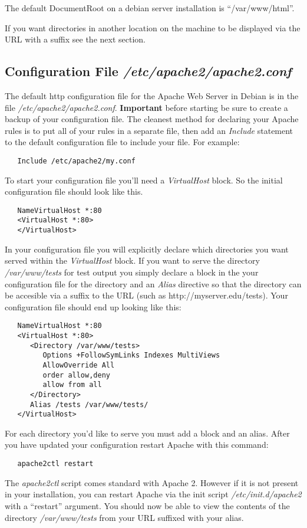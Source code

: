 \documentclass[12pt]{article}
\begin{document}
The default DocumentRoot on a debian server installation is ``/var/www/html''. 

If you want directories in another location on the machine to be displayed via the URL with a suffix see the next section.

\subsection*{Configuration File {\it /etc/apache2/apache2.conf}}

The default http configuration file for the Apache Web Server in Debian is in the file {\it /etc/apache2/apache2.conf}.  \textbf{Important} before starting be sure to create a backup of your configuration file. The cleanest method for declaring your Apache rules is to put all of your rules in a separate file, then add an {\it Include} statement to the default configuration file to include your file. For example:
\begin{verbatim}
   Include /etc/apache2/my.conf
\end{verbatim}
To start your configuration file you'll need a {\it VirtualHost} block. So the initial configuration file should look like this.
\begin{verbatim}
   NameVirtualHost *:80
   <VirtualHost *:80>
   </VirtualHost>
\end{verbatim}
In your configuration file you will explicitly declare which directories you want served within the {\it VirtualHost} block. If you want to serve the directory {\it /var/www/tests} for test output you simply declare a block in the your configuration file for the directory and an {\it Alias} directive so that the directory can be accesible via a suffix to the URL (such as http://myserver.edu/tests). Your configuration file should end up looking like this:
\begin{verbatim}
   NameVirtualHost *:80
   <VirtualHost *:80>   
      <Directory /var/www/tests>
         Options +FollowSymLinks Indexes MultiViews
         AllowOverride All
         order allow,deny
         allow from all
      </Directory>
      Alias /tests /var/www/tests/
   </VirtualHost>
\end{verbatim}
For each directory you'd like to serve you must add a block and an alias. After you have updated your configuration restart Apache with this command:
\begin{verbatim}
   apache2ctl restart
\end{verbatim}
The \textit{apache2ctl} script comes standard with Apache 2. However if it is not present in your installation, you can restart Apache via the init script \textit{/etc/init.d/apache2} with a ``restart'' argument. You should now be able to view the contents of the directory {\it /var/www/tests} from your URL suffixed with your alias.
\end{document}

